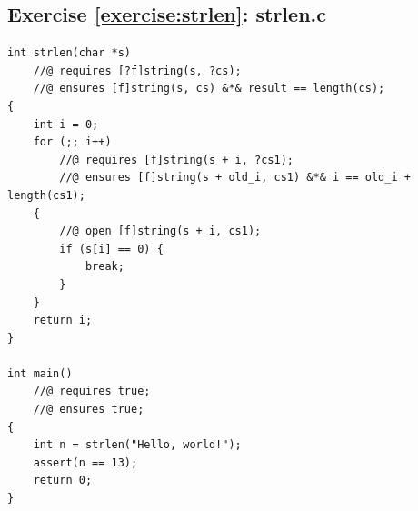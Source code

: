 \documentclass{article}
\begin{document}
\subsection{Exercise \ref{exercise:strlen}: strlen.c}\label{solution:strlen}

\begin{lstlisting}
int strlen(char *s)
    //@ requires [?f]string(s, ?cs);
    //@ ensures [f]string(s, cs) &*& result == length(cs);
{
    int i = 0;
    for (;; i++)
        //@ requires [f]string(s + i, ?cs1);
        //@ ensures [f]string(s + old_i, cs1) &*& i == old_i + length(cs1);
    {
        //@ open [f]string(s + i, cs1);
        if (s[i] == 0) {
            break;
        }
    }
    return i;
}

int main()
    //@ requires true;
    //@ ensures true;
{
    int n = strlen("Hello, world!");
    assert(n == 13);
    return 0;
}
\end{lstlisting}
\end{document}
